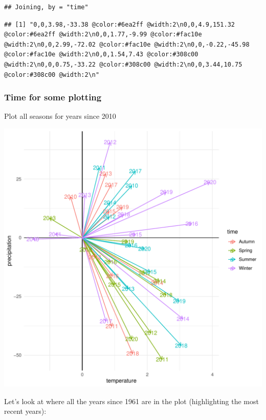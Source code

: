 \documentclass[
]{article}
\begin{document}
\begin{verbatim}
## Joining, by = "time"
\end{verbatim}

\begin{verbatim}
## [1] "0,0,3.98,-33.38 @color:#6ea2ff @width:2\n0,0,4.9,151.32 @color:#6ea2ff @width:2\n0,0,1.77,-9.99 @color:#fac10e @width:2\n0,0,2.99,-72.02 @color:#fac10e @width:2\n0,0,-0.22,-45.98 @color:#fac10e @width:2\n0,0,1.54,7.43 @color:#308c00 @width:2\n0,0,0.75,-33.22 @color:#308c00 @width:2\n0,0,3.44,10.75 @color:#308c00 @width:2\n"
\end{verbatim}

\hypertarget{time-for-some-plotting}{%
\subsubsection{Time for some plotting}\label{time-for-some-plotting}}

Plot all seasons for years since 2010

\includegraphics{notebook_files/figure-latex/seasons-1.pdf}

Let's look at where all the years since 1961 are in the plot
(highlighting the most recent years):
\end{document}
